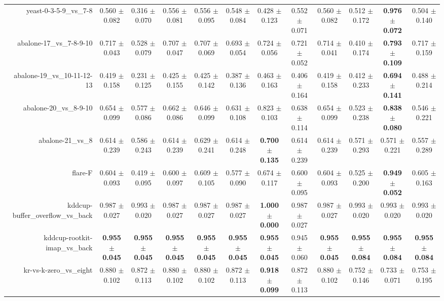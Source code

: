 \begin{table}[!ht]
{\begin{tabular}{r c c c c c c c c c c c}
yeast-0-3-5-9\_vs\_7-8 & 0.560 $\pm$ 0.082 & 0.316 $\pm$ 0.070 & 0.556 $\pm$ 0.081 & 0.556 $\pm$ 0.095 & 0.548 $\pm$ 0.084 & 0.428 $\pm$ 0.123 & 0.552 $\pm$ 0.071 & 0.560 $\pm$ 0.082 & 0.512 $\pm$ 0.172 & \textbf{0.976 $\pm$ 0.072} & 0.504 $\pm$ 0.140 \\
abalone-17\_vs\_7-8-9-10 & 0.717 $\pm$ 0.043 & 0.528 $\pm$ 0.079 & 0.707 $\pm$ 0.047 & 0.707 $\pm$ 0.069 & 0.693 $\pm$ 0.054 & 0.724 $\pm$ 0.056 & 0.721 $\pm$ 0.052 & 0.714 $\pm$ 0.041 & 0.410 $\pm$ 0.174 & \textbf{0.793 $\pm$ 0.109} & 0.717 $\pm$ 0.159 \\
abalone-19\_vs\_10-11-12-13 & 0.419 $\pm$ 0.158 & 0.231 $\pm$ 0.125 & 0.425 $\pm$ 0.155 & 0.425 $\pm$ 0.142 & 0.387 $\pm$ 0.136 & 0.463 $\pm$ 0.163 & 0.406 $\pm$ 0.164 & 0.419 $\pm$ 0.158 & 0.412 $\pm$ 0.233 & \textbf{0.694 $\pm$ 0.141} & 0.488 $\pm$ 0.214 \\
abalone-20\_vs\_8-9-10 & 0.654 $\pm$ 0.099 & 0.577 $\pm$ 0.086 & 0.662 $\pm$ 0.086 & 0.646 $\pm$ 0.099 & 0.631 $\pm$ 0.108 & 0.823 $\pm$ 0.103 & 0.638 $\pm$ 0.114 & 0.654 $\pm$ 0.099 & 0.523 $\pm$ 0.238 & \textbf{0.838 $\pm$ 0.080} & 0.546 $\pm$ 0.221 \\
abalone-21\_vs\_8 & 0.614 $\pm$ 0.239 & 0.586 $\pm$ 0.243 & 0.614 $\pm$ 0.239 & 0.629 $\pm$ 0.241 & 0.614 $\pm$ 0.248 & \textbf{0.700 $\pm$ 0.135} & 0.614 $\pm$ 0.239 & 0.614 $\pm$ 0.239 & 0.571 $\pm$ 0.293 & 0.571 $\pm$ 0.221 & 0.557 $\pm$ 0.289 \\
flare-F & 0.604 $\pm$ 0.093 & 0.419 $\pm$ 0.095 & 0.600 $\pm$ 0.097 & 0.609 $\pm$ 0.105 & 0.577 $\pm$ 0.090 & 0.674 $\pm$ 0.117 & 0.600 $\pm$ 0.095 & 0.604 $\pm$ 0.093 & 0.525 $\pm$ 0.200 & \textbf{0.949 $\pm$ 0.052} & 0.605 $\pm$ 0.163 \\
kddcup-buffer\_overflow\_vs\_back & 0.987 $\pm$ 0.027 & 0.993 $\pm$ 0.020 & 0.987 $\pm$ 0.027 & 0.987 $\pm$ 0.027 & 0.987 $\pm$ 0.027 & \textbf{1.000 $\pm$ 0.000} & 0.987 $\pm$ 0.027 & 0.987 $\pm$ 0.027 & 0.993 $\pm$ 0.020 & 0.993 $\pm$ 0.020 & 0.993 $\pm$ 0.020 \\
kddcup-rootkit-imap\_vs\_back & \textbf{0.955 $\pm$ 0.045} & \textbf{0.955 $\pm$ 0.045} & \textbf{0.955 $\pm$ 0.045} & \textbf{0.955 $\pm$ 0.045} & \textbf{0.955 $\pm$ 0.045} & \textbf{0.955 $\pm$ 0.045} & 0.945 $\pm$ 0.060 & \textbf{0.955 $\pm$ 0.045} & \textbf{0.955 $\pm$ 0.084} & \textbf{0.955 $\pm$ 0.084} & \textbf{0.955 $\pm$ 0.084} \\
kr-vs-k-zero\_vs\_eight & 0.880 $\pm$ 0.102 & 0.872 $\pm$ 0.113 & 0.880 $\pm$ 0.102 & 0.880 $\pm$ 0.102 & 0.872 $\pm$ 0.113 & \textbf{0.918 $\pm$ 0.099} & 0.872 $\pm$ 0.113 & 0.880 $\pm$ 0.102 & 0.752 $\pm$ 0.146 & 0.733 $\pm$ 0.071 & 0.753 $\pm$ 0.195 \\

\end{tabular}}
\end{table}
